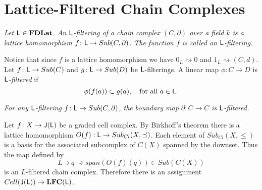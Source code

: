 \section{Lattice-Filtered Chain Complexes}\label{sec:lfc}



\begin{defn}
{\em
Let ${\mathsf L}\in {\bf FDLat}$.
An \emph{${\mathsf L}$-filtering of a chain complex $(C,\partial)$ over a field $k$} is a lattice homomorphism $f\colon {\mathsf L} \to Sub(C,\partial)$.
The function $f$ is called an \emph{${\mathsf L}$-filtering}.
}
\end{defn}


Notice that since $f$ is a lattice homomorphism we have $0_L\rightsquigarrow 0$ and $1_L \rightsquigarrow (C,d)$.  Let $f\colon {\mathsf L} \to Sub(C)$ and $g\colon {\mathsf L} \to Sub(D)$ be ${\mathsf L}$-filterings. 
A linear map $\phi\colon C\to D$ is {\em ${\mathsf L}$-filtered} if
\[
\phi(f(a)) \subset g(a),\quad\text{for all $a\in{\mathsf L}$}.
\]




\begin{ex}
{\em
For any ${\mathsf L}$-filtering $f\colon {\mathsf L} \to Sub(C,\partial)$,
the boundary map $\partial\colon C\to C$ is ${\mathsf L}$-filtered.
}
\end{ex}

\begin{ex}


Let $f\colon X\to {\mathsf J}({\mathsf L})$ be a graded cell complex.  By Birkhoff's theorem there is a lattice homomorphism $O(f):{\mathsf L}\to Sub_{Cl}(X,\preceq)$.  Each element of $Sub_{Cl}(X,\leq)$ is a basis for the associated subcomplex of $C(X)$ spanned by the downset.   Thus the map defined by $$L\ni q\rightsquigarrow span(O(f)(q))\in Sub(C(X))$$ is an $L$-filtered chain complex.  Therefore there is an assignment $Cell({\mathsf J}({\mathsf L}))\to {\bf LFC}({\mathsf L})$.


 
\end{ex}







